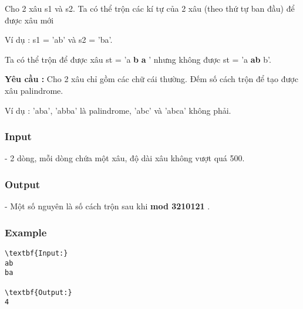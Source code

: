 

Cho 2 xâu s1 và s2. Ta có thể trộn các kí tự của 2 xâu (theo thứ tự ban đầu) để được xâu mới

Ví dụ : s1 = 'ab' và s2 = 'ba'.

Ta có thể trộn để được xâu st = 'a\textbf{ b }\textbf{ a } ' nhưng không được st = 'a\textbf{ ab }b'.

\textbf{Yêu cầu : } Cho 2 xâu chỉ gồm các chữ cái thường. Đếm số cách trộn để tạo được xâu palindrome.

Ví dụ : 'aba', 'abba' là palindrome, 'abc' và 'abca' không phải.

\subsubsection{Input}

- 2 dòng, mỗi dòng chứa một xâu, độ dài xâu không vượt quá 500.

\subsubsection{Output}

- Một số nguyên là số cách trộn sau khi \textbf{ mod 3210121 } .

\subsubsection{Example}
\begin{verbatim}
\textbf{Input:}
ab
ba

\textbf{Output:}
4\end{verbatim}

 
